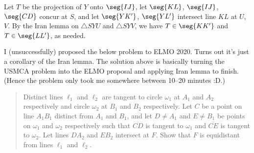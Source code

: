 Let $T$ be the projection of $Y$ onto $\seg{IJ}$, let $\seg{KL}$, $\seg{IJ}$, $\seg{CD}$ concur at $S$, and let $\seg{YK'}$, $\seg{YL'}$ intersect line $KL$ at $U$, $V$. By the Iran lemma on $\triangle SYU$ and $\triangle SYV$, we have $T\in\seg{KK'}$ and $T\in\seg{LL'}$, as needed.
\begin{remark}
    I (unsuccessfully) proposed the below problem to ELMO 2020. Turns out it's just a corollary of the Iran lemma. The solution above is basically turning the USMCA problem into the ELMO proposal and applying Iran lemma to finish. (Hence the problem only took me somewhere between 10--20 minutes :D.)
    \begin{quote}
        Distinct lines $\ell_1$ and $\ell_2$ are tangent to circle $\omega_1$ at $A_1$ and $A_2$ respectively and circle $\omega_2$ at $B_1$ and $B_2$ respectively. Let $C$ be a point on line $A_1B_1$ distinct from $A_1$ and $B_1$, and let $D\ne A_1$ and $E\ne B_1$ be points on $\omega_1$ and $\omega_2$ respectively such that $\overline{CD}$ is tangent to $\omega_1$ and $\overline{CE}$ is tangent to $\omega_2$. Let lines $DA_2$ and $EB_2$ intersect at $F$. Show that $F$ is equidistant from lines $\ell_1$ and $\ell_2$.
    \end{quote}
\end{remark}

